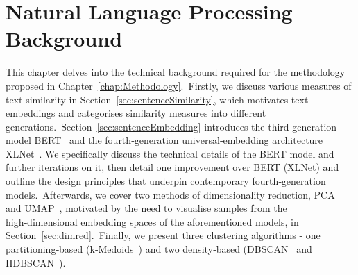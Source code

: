\documentclass[10pt,oneside]{report}
\begin{document}
\chapter{Natural Language Processing Background}\label{chap:nlpbg}

This chapter delves into the technical background required for the methodology proposed in Chapter \ref{chap:Methodology}. Firstly, we discuss various measures of text similarity in Section \ref{sec:sentenceSimilarity}, which motivates text embeddings and categorises similarity measures into different generations. Section \ref{sec:sentenceEmbedding} introduces the third‑generation model BERT \cite{devlin2019bert} and the fourth‑generation universal‐embedding architecture XLNet \cite{yang2019xlnet}. We specifically discuss the technical details of the BERT model and further iterations on it, then detail one improvement over BERT (XLNet) and outline the design principles that underpin contemporary fourth‑generation models. Afterwards, we cover two methods of dimensionality reduction,  PCA \cite{pearson1901liii,hotelling1933analysis} and UMAP \cite{mcinnes2018umap}, motivated by the need to visualise samples from the high‑dimensional embedding spaces of the aforementioned models, in Section \ref{sec:dimred}. Finally, we present three clustering algorithms - one partitioning‑based (k‑Medoids \cite{kmedoids}) and two density‑based (DBSCAN \cite{ester1996density} and HDBSCAN \cite{campello2013density}).



\end{document}
